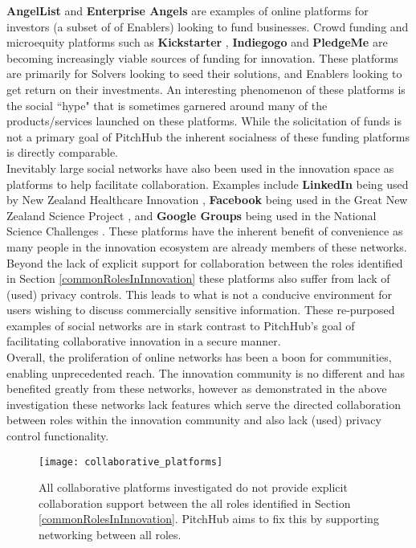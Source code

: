 \newline
\textbf{AngelList} \cite{Angel:online} and \textbf{Enterprise Angels} \cite{enterpriseAngles:online} are examples of online platforms for investors (a subset of of Enablers) looking to fund businesses. Crowd funding and microequity platforms such as \textbf{Kickstarter} \cite{Kicks6:online}, \textbf{Indiegogo} \cite{Indie3:online} and \textbf{PledgeMe} \cite{Pledge:online} are becoming increasingly viable sources of funding for innovation. These platforms are primarily for Solvers looking to seed their solutions, and Enablers looking to get return on their investments. An interesting phenomenon of these platforms is the social ``hype" that is sometimes garnered around many of the products/services launched on these platforms. While the solicitation of funds is not a primary goal of PitchHub the inherent socialness of these funding platforms is directly comparable.
\\
\newline
Inevitably large social networks have also been used in the innovation space as platforms to help facilitate collaboration. Examples include \textbf{LinkedIn} \cite{Linkedin:online} being used by New Zealand Healthcare Innovation \cite{nzHealthCare:online}, \textbf{Facebook} \cite{Faceb6:online} being used in the Great New Zealand Science Project \cite{greatNZScience:online}, and \textbf{Google Groups} \cite{Googlegroups:online} being used in the National Science Challenges \cite{nzNSC10:online}. These platforms have the inherent benefit of convenience as many people in the innovation ecosystem are already members of these networks. Beyond the lack of explicit support for collaboration between the roles identified in Section \ref{commonRolesInInnovation} these platforms also suffer from lack of (used) privacy controls. This leads to what is not a conducive environment for users wishing to discuss commercially sensitive information. These re-purposed examples of social networks are in stark contrast to PitchHub's goal of facilitating collaborative innovation in a secure manner.
\\
\newline
Overall, the proliferation of online networks has been a boon for communities, enabling unprecedented reach. The innovation community is no different and has benefited greatly from these networks, however as demonstrated in the above investigation these networks lack features which serve the directed collaboration between roles within the innovation community and also lack (used) privacy control functionality.

\begin{figure}[ht]
    \centering
    \texttt{[image: collaborative\_platforms]}
    \caption{All collaborative platforms investigated do not provide explicit collaboration support between the all roles identified in Section \ref{commonRolesInInnovation}. PitchHub aims to fix this by supporting networking between all roles. }
    \label{fig:collaborative_platforms}
\end{figure}

